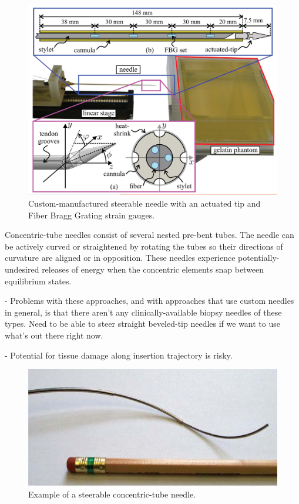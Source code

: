 \begin{figure}[h]
\includegraphics[width=1.0\textwidth]{Fig/chap2/actuated_tip_needle.png}
\caption{Custom-manufactured steerable needle with an actuated tip and Fiber Bragg Grating strain gauges\cite{roesthuis_modeling_2015}.}
\label{fig:actuated_tip}
\end{figure}

Concentric-tube needles consist of several nested pre-bent tubes\cite{webster_mechanics_2009, rucker_geometrically_2010, dupont_design_2010-1}. The needle can be actively curved or straightened by rotating the tubes so their directions of curvature are aligned or in opposition. These needles experience potentially-undesired releases of energy when the concentric elements snap between equilibrium states.

- Problems with these approaches, and with approaches that use custom needles in general, is that there aren't any clinically-available biopsy needles of these types. Need to be able to steer straight beveled-tip needles if we want to use what's out there right now.

- Potential for tissue damage along insertion trajectory is risky.

\begin{figure}[h]
\includegraphics[width=1.0\textwidth]{Fig/chap2/concentric_needle.png}
\caption{Example of a steerable concentric-tube needle\cite{rucker_geometrically_2010}.}
\label{fig:concentric_tubes}
\end{figure}


